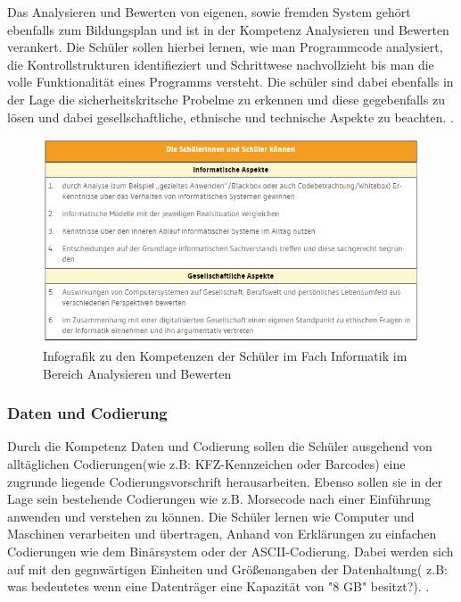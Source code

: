 Das Analysieren und Bewerten von eigenen, sowie fremden System gehört ebenfalls zum Bildungsplan und ist in der Kompetenz Analysieren und Bewerten verankert. Die Schüler sollen hierbei lernen, wie man Programmcode analysiert, die Kontrollstrukturen identifieziert und Schrittwese nachvollzieht bis man die volle Funktionalität eines Programms versteht. Die schüler sind dabei ebenfalls in der Lage die sicherheitskritsche Probelme zu erkennen und diese gegebenfalls zu lösen und dabei gesellschaftliche, ethnische und technische Aspekte zu beachten.
\cite{Analy}.

\begin{figure}[H]
	\centering
	\includegraphics[width=\textwidth,height=\textheight,keepaspectratio]{images/Analysieren.png}
	\caption{Infografik zu den Kompetenzen der Schüler im Fach Informatik im Bereich Analysieren und Bewerten}
	\label{Analysieren und Bewerten Infografik}
\end{figure}

\subsubsection{Daten und Codierung}

Durch die Kompetenz Daten und Codierung sollen die Schüler ausgehend von alltäglichen Codierungen(wie z.B: KFZ-Kennzeichen oder Barcodes) eine zugrunde liegende Codierungsvorschrift herausarbeiten. Ebenso sollen sie in der Lage sein bestehende Codierungen wie z.B. Morsecode nach einer Einführung anwenden und verstehen zu können. Die Schüler lernen wie Computer und Maschinen verarbeiten und übertragen, Anhand von Erklärungen zu einfachen Codierungen wie dem Binärsystem oder der ASCII-Codierung. Dabei werden sich auf mit den gegnwärtigen Einheiten und Größenangaben der Datenhaltung( z.B: was bedeutetes wenn eine Datenträger eine Kapazität von "8 GB" besitzt?). \cite{Daten}.


